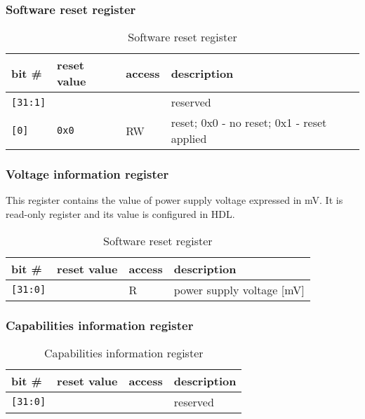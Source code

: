     \subsubsection{Software reset register}
    \label{sec:reset_reg}
    
    \begin{table}[H]
    \caption{Software reset register}
        \begin{tabular}{m{1.3cm}|m{2cm}|m{1cm}|m{8cm}}
                \rowcolor[gray]{0.7} bit \# & reset value & access & description \\ \hline \hline
                \texttt{[31:1]} & & & reserved \\ \hline
                \texttt{[0]} & \texttt{0x0} & RW & reset; 0x0 - no reset; 0x1 - reset applied \\ \hline
                \hline
        \end{tabular}
        \label{tab:reset_reg}
    \end{table}
    
    \subsubsection{Voltage information register}
    \label{sec:voltage_reg}
    
    This register contains the value of power supply voltage expressed in mV. It is read-only register and its
    value is configured in HDL.
    
    \begin{table}[H]
    \caption{Software reset register}
        \begin{tabular}{m{1.3cm}|m{2cm}|m{1cm}|m{8cm}}
                \rowcolor[gray]{0.7} bit \# & reset value & access & description \\ \hline \hline
                \texttt{[31:0]} & & R & power supply voltage [mV] \\ \hline
                \hline
        \end{tabular}
        \label{tab:voltage_reg}
    \end{table}
    
    \subsubsection{Capabilities information register}
    \label{sec:capa_reg}
    
    \begin{table}[H]
    \caption{Capabilities information register}
        \begin{tabular}{m{1.3cm}|m{2cm}|m{1cm}|m{8cm}}
                \rowcolor[gray]{0.7} bit \# & reset value & access & description \\ \hline \hline
                \texttt{[31:0]} & & & reserved \\ \hline
                \hline
        \end{tabular}
        \label{tab:capa_reg}
    \end{table}
    
